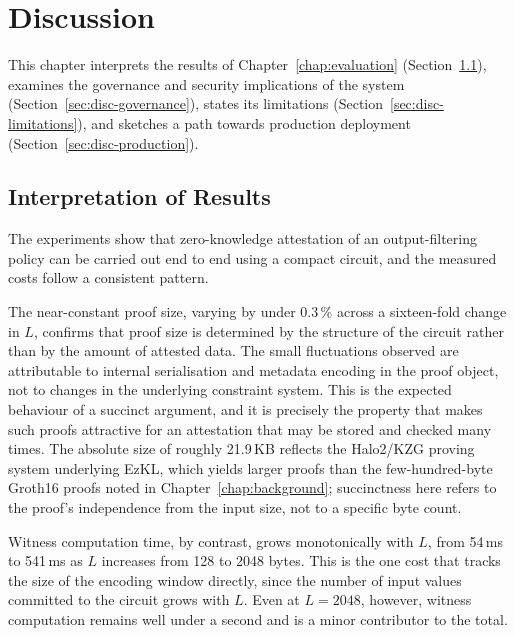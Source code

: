 \chapter{Discussion}
\label{chap:discussion}

This chapter interprets the results of Chapter~\ref{chap:evaluation} (Section~\ref{sec:disc-interpretation}), examines the governance and security implications of the system (Section~\ref{sec:disc-governance}), states its limitations (Section~\ref{sec:disc-limitations}), and sketches a path towards production deployment (Section~\ref{sec:disc-production}).

\section{Interpretation of Results}
\label{sec:disc-interpretation}

The experiments show that zero-knowledge attestation of an output-filtering policy can be carried out end to end using a compact circuit, and the measured costs follow a consistent pattern.

\medskip

The near-constant proof size, varying by under 0.3\,\% across a sixteen-fold change in $L$, confirms that proof size is determined by the structure of the circuit rather than by the amount of attested data. The small fluctuations observed are attributable to internal serialisation and metadata encoding in the proof object, not to changes in the underlying constraint system. This is the expected behaviour of a succinct argument, and it is precisely the property that makes such proofs attractive for an attestation that may be stored and checked many times. The absolute size of roughly 21.9\,KB reflects the Halo2/KZG proving system underlying EzKL, which yields larger proofs than the few-hundred-byte Groth16 proofs noted in Chapter~\ref{chap:background}; succinctness here refers to the proof's independence from the input size, not to a specific byte count.

\medskip

Witness computation time, by contrast, grows monotonically with $L$, from 54\,ms to 541\,ms as $L$ increases from 128 to 2048 bytes. This is the one cost that tracks the size of the encoding window directly, since the number of input values committed to the circuit grows with $L$. Even at $L = 2048$, however, witness computation remains well under a second and is a minor contributor to the total.

\medskip

